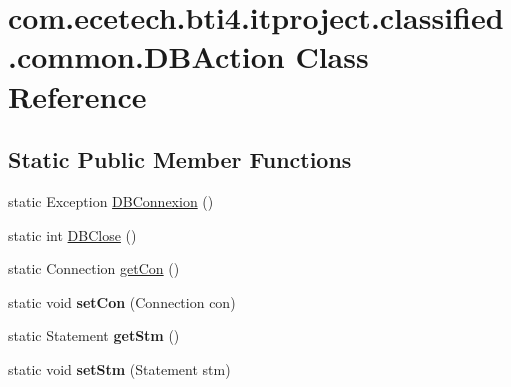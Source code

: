 \hypertarget{classcom_1_1ecetech_1_1bti4_1_1itproject_1_1classified_1_1common_1_1_d_b_action}{}\section{com.\+ecetech.\+bti4.\+itproject.\+classified.\+common.\+D\+B\+Action Class Reference}
\label{classcom_1_1ecetech_1_1bti4_1_1itproject_1_1classified_1_1common_1_1_d_b_action}
\subsection*{Static Public Member Functions}
\begin{DoxyCompactItemize}
\item 
static Exception \hyperlink{classcom_1_1ecetech_1_1bti4_1_1itproject_1_1classified_1_1common_1_1_d_b_action_a03b522e1388500132c0de54ad5ba35da}{D\+B\+Connexion} ()
\item 
static int \hyperlink{classcom_1_1ecetech_1_1bti4_1_1itproject_1_1classified_1_1common_1_1_d_b_action_a9e2f615b938168702c83370c13f629ad}{D\+B\+Close} ()
\item 
static Connection \hyperlink{classcom_1_1ecetech_1_1bti4_1_1itproject_1_1classified_1_1common_1_1_d_b_action_a5831883b0b490e9528f2604904610dbe}{get\+Con} ()
\item 
static void {\bfseries set\+Con} (Connection con)\hypertarget{classcom_1_1ecetech_1_1bti4_1_1itproject_1_1classified_1_1common_1_1_d_b_action_a1229309e09cf59bc09814488e449608e}{}\label{classcom_1_1ecetech_1_1bti4_1_1itproject_1_1classified_1_1common_1_1_d_b_action_a1229309e09cf59bc09814488e449608e}

\item 
static Statement {\bfseries get\+Stm} ()\hypertarget{classcom_1_1ecetech_1_1bti4_1_1itproject_1_1classified_1_1common_1_1_d_b_action_acbac8f8d13d537ed7be8553809762134}{}\label{classcom_1_1ecetech_1_1bti4_1_1itproject_1_1classified_1_1common_1_1_d_b_action_acbac8f8d13d537ed7be8553809762134}

\item 
static void {\bfseries set\+Stm} (Statement stm)\hypertarget{classcom_1_1ecetech_1_1bti4_1_1itproject_1_1classified_1_1common_1_1_d_b_action_a6aedd826db70e9c3736ca969599c1d43}{}\label{classcom_1_1ecetech_1_1bti4_1_1itproject_1_1classified_1_1common_1_1_d_b_action_a6aedd826db70e9c3736ca969599c1d43}


\end{DoxyCompactItemize}

